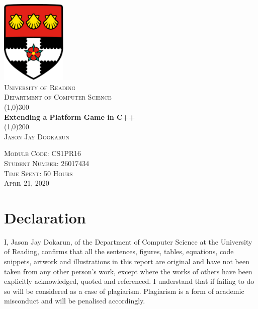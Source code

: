 \documentclass{article}
\begin{document}
\begin{titlepage}

    \begin{center}
        \includegraphics[height= 4cm ]{UoRlogo.png} \\
        [5mm]
        \textsc{\Large University of Reading} \\
        [0.5cm]
        \textsc{\Large Department of Computer Science} \\
        [1cm]

        \line(1,0){300}\\
        [0.25in]
        \huge{\bfseries Extending a Platform Game in C\CC++}\\
        [2mm]
        \line(1,0){200} \\
        [1cm]
        \textsc{\Large Jason Jay Dookarun} \\
        [4cm]
        \end{center}

        \begin{flushright}

        \textsc{\normalsize Module Code: CS1PR16 \\
        Student Number: 26017434 \\
        Time Spent: 50 Hours \\
        April 21, 2020 } \\
        \end{flushright}
\end{titlepage}

\section{Declaration}\label{sec:declaration}
I, Jason Jay Dokarun, of the Department of Computer Science at the University of Reading, confirms that all the sentences, figures, tables, equations, code snippets, artwork and illustrations in this report are original and have not been taken from any other person’s work, except where the works of others have been explicitly acknowledged, quoted and referenced. I understand that if failing to do so will be considered as a case of plagiarism. Plagiarism is a form of academic misconduct and will be penalised accordingly.

\lipsum[1]
\end{document}
